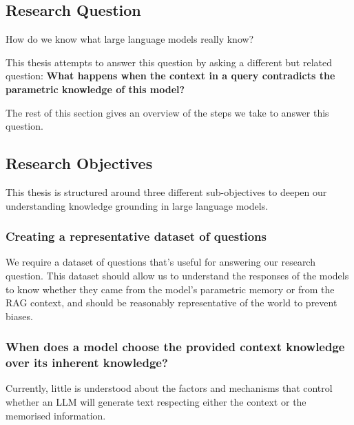 \subsection{Research Question}

How do we know what large language models really know?

This thesis attempts to answer this question by asking a different but related question: \textbf{What happens when the context in a query contradicts the parametric knowledge of this model?}

The rest of this section gives an overview of the steps we take to answer this question.

\subsection{Research Objectives}

This thesis is structured around three different sub-objectives to deepen our understanding knowledge grounding in large language models.


\subsubsection{Creating a representative dataset of questions}
\label{questions_objective}

We require a dataset of questions that's useful for answering our research question.
This dataset should allow us to understand the responses of the models to know whether they came from the model's parametric memory or from the RAG context, and should be reasonably representative of the world to prevent biases.

\subsubsection{When does a model choose the provided context knowledge over its inherent knowledge?}
\label{intro_models_numbers}

Currently, little is understood about the factors and mechanisms that control whether an LLM will generate text respecting either the context or the memorised information.

